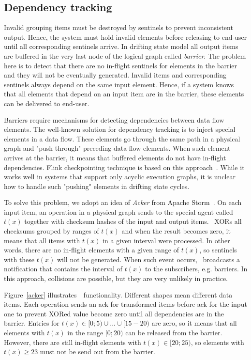 \subsection{Dependency tracking}

Invalid grouping items must be destroyed by sentinels to prevent inconsistent output. Hence, the system must hold invalid elements before releasing to end-user until all corresponding sentinels arrive. In drifting state model all output items are buffered in the very last node of the logical graph called {\em barrier}. The problem here is to detect that there are no in-flight sentinels for elements in the barrier and they will not be eventually generated. Invalid items and corresponding sentinels always depend on the same input element. Hence, if a system knows that all elements that depend on an input item are in the barrier, these elements can be delivered to end-user. 

Barriers require mechanisms for detecting dependencies between data flow elements. The well-known solution for dependency tracking is to inject special elements in a data flow. These elements go through the same path in a physical graph and "push through" preceding data flow elements. When such element arrives at the barrier, it means that buffered elements do not have in-flight dependencies. Flink checkpointing technique is based on this approach~\cite{Carbone:2017:SMA:3137765.3137777}. While it works well in systems that support only acyclic execution graphs, it is unclear how to handle such "pushing" elements in drifting state cycles. 

To solve this problem, we adopt an idea of {\em Acker} from Apache Storm~\cite{apache:storm}. On each input item, an operation in a physical graph sends to the special agent called~{\em \Acker\ } $t(x)$ together with checksum hashes of the input and output items. \Acker\ XORs all checksums grouped by ranges of $t(x)$ and when the result becomes zero, it means that all items with $t(x)$ in a given interval were processed. In other words, there are no in-flight elements with a given range of $t(x)$, so sentinels with these $t(x)$ will not be generated. When such event occurs, \Acker\ broadcasts a notification that contains the interval of $t(x)$ to the subscribers, e.g. barriers. In this approach, collisions are possible, but they are very unlikely in practice.

Figure~\ref{acker} illustrates~\Acker\ functionality. Different shapes mean different data items. Each operation sends an ack for transformed items before ack for the input one to prevent XORed value become zero until all dependencies are in the barrier. Entries for $t(x) \in [0;5) \cup ... \cup [15-20)$ are zero, so it means that all elements with $t(x)$ in the range $[0;20)$ can be released from the barrier. However, there are still in-flight elements with $t(x) \in [20;25)$, so elements with $t(x) \geq 23$ must not be send out from the barrier.

